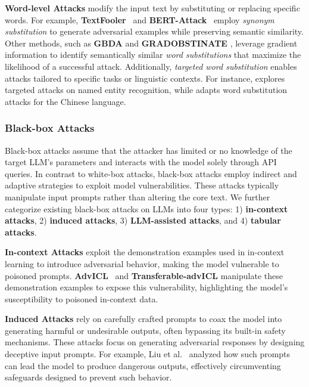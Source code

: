 \textbf{Word-level Attacks} modify the input text by substituting or replacing specific words. For example, \textbf{TextFooler}~\cite{jin2020bert} and \textbf{BERT-Attack}~\cite{li2020bert} employ \textit{synonym substitution} to generate adversarial examples while preserving semantic similarity. Other methods, such as \textbf{GBDA} \cite{guo2021gradient} and \textbf{GRADOBSTINATE} \cite{wang2023gradient}, leverage gradient information to identify semantically similar \textit{word substitutions} that maximize the likelihood of a successful attack. Additionally, \textit{targeted word substitution} enables attacks tailored to specific tasks or linguistic contexts. For instance, \cite{dirkson2021breaking} explores targeted attacks on named entity recognition, while \cite{liu2023expanding} adapts word substitution attacks for the Chinese language.

\subsubsection{Black-box Attacks}

Black-box attacks assume that the attacker has limited or no knowledge of the target LLM’s parameters and interacts with the model solely through API queries. In contrast to white-box attacks, black-box attacks employ indirect and adaptive strategies to exploit model vulnerabilities. These attacks typically manipulate input prompts rather than altering the core text. We further categorize existing black-box attacks on LLMs into four types: 1) \textbf{in-context attacks}, 2) \textbf{induced attacks}, 3) \textbf{LLM-assisted attacks}, and 4) \textbf{tabular attacks}.

\textbf{In-context Attacks} exploit the demonstration examples used in in-context learning to introduce adversarial behavior, making the model vulnerable to poisoned prompts. \textbf{AdvICL}~\cite{wang2023adversarial} and \textbf{Transferable-advICL} manipulate these demonstration examples to expose this vulnerability, highlighting the model’s susceptibility to poisoned in-context data.

\textbf{Induced Attacks} rely on carefully crafted prompts to coax the model into generating harmful or undesirable outputs, often bypassing its built-in safety mechanisms. These attacks focus on generating adversarial responses by designing deceptive input prompts. For example, Liu et al.~\cite{liu2023adversarial} analyzed how such prompts can lead the model to produce dangerous outputs, effectively circumventing safeguards designed to prevent such behavior.


